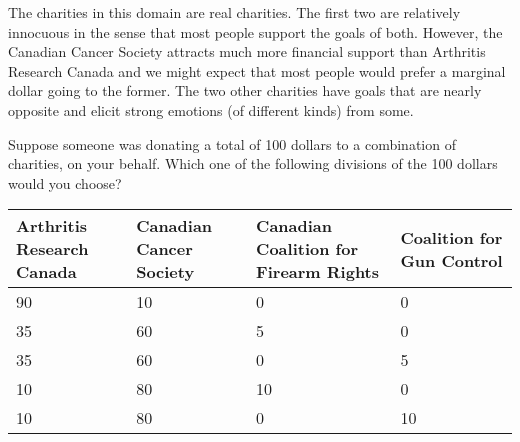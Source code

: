 The charities in this domain are real charities.
The first two are relatively innocuous in the sense that most people support the goals of both.
However, the Canadian Cancer Society attracts much more financial support than Arthritis Research Canada and we might expect that most people would prefer a marginal dollar going to the former.
The two other charities have goals that are nearly opposite and elicit strong emotions (of different kinds) from some.

\begin{tcolorbox}
Suppose someone was donating a total of 100 dollars to a combination of charities,
on your behalf.
Which one of the following divisions of the 100 dollars would you choose?

\begin{tabular}{p{35mm}|p{35mm}|p{35mm}|p{35mm}}
\hline
Arthritis Research Canada &
Canadian Cancer Society &
Canadian Coalition for Firearm Rights &
Coalition for Gun Control \\
\hline
90 & 10 & 0 & 0 \\
35 & 60 & 5 & 0 \\
35 & 60 & 0 & 5 \\
10 & 80 & 10 & 0 \\
10 & 80 & 0 & 10 \\
\hline
\end{tabular}
\end{tcolorbox}
